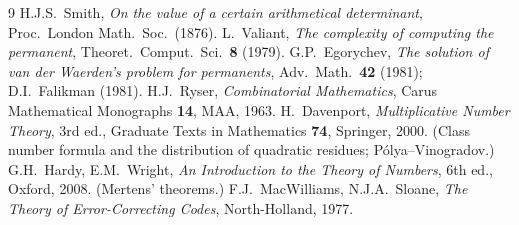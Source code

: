 \documentclass[11pt]{article}
\theoremstyle{remark}\newtheorem{remark}[theorem]{Remark}
\begin{document}
\begin{thebibliography}{9}
 H.J.S.\ Smith, \emph{On the value of a certain arithmetical
determinant}, Proc.\ London Math.\ Soc.\ (1876).
 L.\ Valiant, \emph{The complexity of computing the
permanent}, Theoret.\ Comput.\ Sci.\ \textbf{8} (1979).
 G.P.\ Egorychev, \emph{The solution of van der Waerden's problem
for permanents}, Adv.\ Math.\ \textbf{42} (1981); D.I.\ Falikman (1981).
 H.J.\ Ryser, \emph{Combinatorial Mathematics}, Carus Mathematical
Monographs \textbf{14}, MAA, 1963.
 H.\ Davenport, \emph{Multiplicative Number Theory}, 3rd ed.,
Graduate Texts in Mathematics \textbf{74}, Springer, 2000. (Class number formula and
the distribution of quadratic residues; P\'olya--Vinogradov.)
 G.H.\ Hardy, E.M.\ Wright, \emph{An Introduction to the Theory of
Numbers}, 6th ed., Oxford, 2008. (Mertens' theorems.)
 F.J.\ MacWilliams, N.J.A.\ Sloane, \emph{The Theory of
Error-Correcting Codes}, North-Holland, 1977.
\end{thebibliography}
\end{document}
